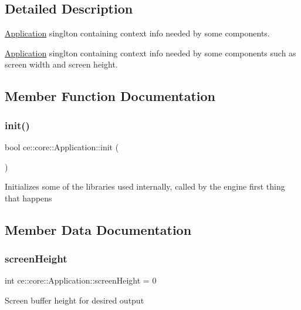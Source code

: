 \subsection{Detailed Description}
\hyperlink{classce_1_1core_1_1_application}{Application} singlton containing context info needed by some components. 

\hyperlink{classce_1_1core_1_1_application}{Application} singlton containing context info needed by some components such as screen width and screen height. 

\subsection{Member Function Documentation}
\mbox{\label{classce_1_1core_1_1_application_ad93435a68fa6eb317d85a3465f45d0d5}} 
\subsubsection{\texorpdfstring{init()}{init()}}
{\footnotesize\ttfamily bool ce\+::core\+::\+Application\+::init (\begin{DoxyParamCaption}{ }\end{DoxyParamCaption})}

Initializes some of the libraries used internally, called by the engine first thing that happens 

\subsection{Member Data Documentation}
\mbox{\label{classce_1_1core_1_1_application_a4b3734ba6626a5a3db7b08069077ea42}} 
\subsubsection{\texorpdfstring{screen\+Height}{screenHeight}}
{\footnotesize\ttfamily int ce\+::core\+::\+Application\+::screen\+Height = 0}

Screen buffer height for desired output \mbox{\label{classce_1_1core_1_1_application_a0ba59c070c6163986b246bd4927ca1a3}} 
